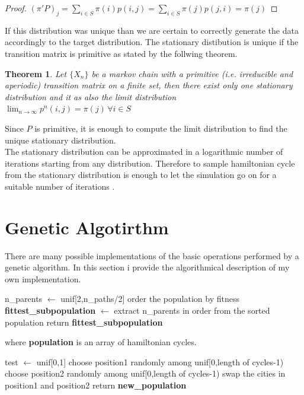 \documentclass{article}
\newtheorem{theorem}{Theorem}
\begin{document}
\begin{proof}
$ (\pi'P)_j = \sum_{i \in S} \pi(i)p(i,j) = \sum_{i \in S} \pi(j)p(j,i) = \pi(j) $ 
\end{proof}
\noindent If this distribution was unique than we are certain to correctly generate the data accordingly to the target distribution. The stationary distibution is unique if the transition matrix is primitive as stated by the follwing theorem.
\begin{theorem}
Let $\{X_n\}$ be a markov chain with a primitive (i.e. irreducible and aperiodic) transition matrix on a finite set, then  there exist only one stationary distribution and it as also the limit distribution $\lim_{n \to \infty} p^n(i,j) = \pi(j)\,  \forall i \in S$
\end{theorem}
\noindent Since $P$ is primitive, it is enough to compute the limit distribution to find the unique stationary distribution. \\
The stationary distribution can be approximated in a logarithmic number of iterations starting from any distribution. Therefore to sample hamiltonian cycle from the stationary distribution is enough to let the simulation go on for a suitable number of iterations \cite{mcalgorithm}. \\
\section{Genetic Algotirthm}
There are many possible implementations of the basic operations performed by a genetic algorithm. In this section i provide the algorithmical description of my own implementation.
\begin{algorithm}[H]
    \begin{algorithmic}[1]
        \State n\_parents $\leftarrow$ unif[2,n\_paths/2]
        \State order the population by fitness
        \State \textbf{fittest\_subpopulation} $\leftarrow$ extract n\_parents in order from the sorted population
        \State return \textbf{fittest\_subpopulation}
       \EndFunction
\end{algorithmic}
\end{algorithm}
\noindent where \textbf{population} is an array of hamiltonian cycles.



\begin{algorithm}[H]
    \begin{algorithmic}[1]
        \State test $\leftarrow$ unif[0,1]
        	\State choose position1 randomly among unif[0,length of cycles-1)
  			\State choose position2 randomly among unif[0,length of cycles-1)
  			\State swap the cities in position1 and position2
        \EndIf
       \EndFor
        \State return \textbf{new\_population}
       \EndFunction
\end{algorithmic}
\end{algorithm}
\end{document}
